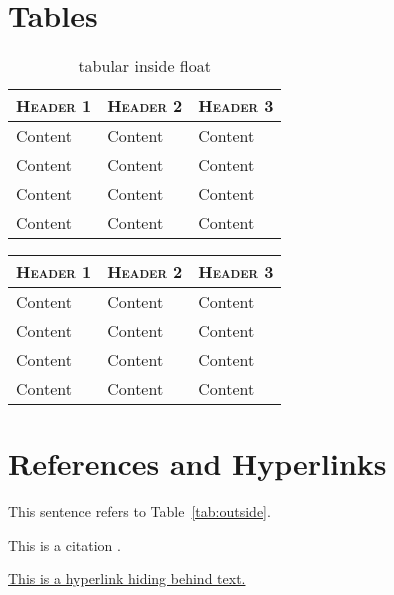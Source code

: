 \documentclass[a4paper,11pt,oneside,showtrims]{alpenthesis}
\begin{document}
\scslshape\lipsum[9]

\normalfont

\chapter{Tables}
\begin{table}
    \centering
    \caption{tabular inside float}
    \label{tab:float}
    \begin{tabular}{lll}
        \toprule
        \scshape Header 1 & \scshape Header 2 & \scshape Header 3 \\
        \midrule
        Content           & Content           & Content           \\
        Content           & Content           & Content           \\
        Content           & Content           & Content           \\
        Content           & Content           & Content           \\
        \bottomrule
    \end{tabular}
\end{table}

\lipsum[3]

\begin{center}
    \label{tab:outside}
    \begin{tabular}{lll}
        \toprule
        \scshape Header 1 & \scshape Header 2 & \scshape Header 3 \\
        \midrule
        Content           & Content           & Content           \\
        Content           & Content           & Content           \\
        Content           & Content           & Content           \\
        Content           & Content           & Content           \\
        \bottomrule
    \end{tabular}
\end{center}

\chapter{References and Hyperlinks}
This sentence refers to Table~\ref{tab:outside}.

This is a citation \cite{testitem}.

\href{https://hyperlink.com}{This is a hyperlink hiding behind text.}
\end{document}
